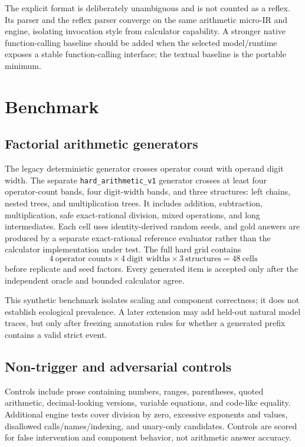 \documentclass[11pt]{article}
\begin{document}
The explicit format is deliberately unambiguous and is not counted as a reflex.
Its parser and the reflex parser converge on the same arithmetic micro-IR and
engine, isolating invocation style from calculator capability. A stronger native
function-calling baseline should be added when the selected model/runtime exposes
a stable function-calling interface; the textual baseline is the portable minimum.

\section{Benchmark}

\subsection{Factorial arithmetic generators}

The legacy deterministic generator crosses operator count with operand digit
width. The separate \texttt{hard\_arithmetic\_v1} generator crosses at least four
operator-count bands, four digit-width bands, and three structures: left chains,
nested trees, and multiplication trees. It includes addition, subtraction,
multiplication, safe exact-rational division, mixed operations, and long
intermediates. Each cell uses identity-derived random seeds, and gold answers are
produced by a separate exact-rational reference evaluator rather than the
calculator implementation under test. The full hard grid contains
\[
4\ \text{operator counts}\times
4\ \text{digit widths}\times
3\ \text{structures}=48\ \text{cells}
\]
before replicate and seed factors. Every generated item is accepted only after
the independent oracle and bounded calculator agree.

This synthetic benchmark isolates scaling and component correctness; it does not
establish ecological prevalence. A later extension may add held-out natural
model traces, but only after freezing annotation rules for whether a generated
prefix contains a valid strict event.

\subsection{Non-trigger and adversarial controls}

Controls include prose containing numbers, ranges, parentheses, quoted
arithmetic, decimal-looking versions, variable equations, and code-like equality.
Additional engine tests cover division by zero, excessive exponents and values,
disallowed calls/names/indexing, and unary-only candidates. Controls are scored
for false intervention and component behavior, not arithmetic answer accuracy.
\end{document}
